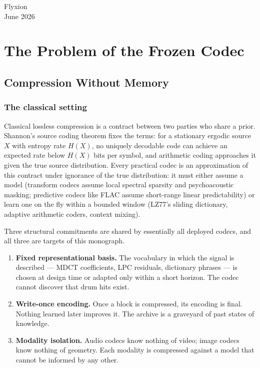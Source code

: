 \documentclass[11pt,oneside]{book}
\theoremstyle{remark}
\begin{document}
\medskip
\noindent Flyxion\\
June 2026

\tableofcontents

\mainmatter

\part{The Problem of the Frozen Codec}

\chapter{Compression Without Memory}

\section{The classical setting}

Classical lossless compression is a contract between two parties who
share a prior. Shannon's source coding theorem fixes the terms: for a
stationary ergodic source $X$ with entropy rate $H(X)$, no uniquely
decodable code can achieve an expected rate below $H(X)$ bits per
symbol, and arithmetic coding approaches it given the true source
distribution. Every practical codec is an approximation of this
contract under ignorance of the true distribution: it must either assume
a model (transform codecs assume local spectral sparsity and
psychoacoustic masking; predictive codecs like FLAC assume short-range
linear predictability) or learn one on the fly within a bounded window
(LZ77's sliding dictionary, adaptive arithmetic coders, context mixing).

Three structural commitments are shared by essentially all deployed
codecs, and all three are targets of this monograph.

\begin{enumerate}[leftmargin=2em]
\item \textbf{Fixed representational basis.} The vocabulary in which the
signal is described --- MDCT coefficients, LPC residuals, dictionary
phrases --- is chosen at design time or adapted only within a short
horizon. The codec cannot discover that drum hits exist.
\item \textbf{Write-once encoding.} Once a block is compressed, its
encoding is final. Nothing learned later improves it. The archive is a
graveyard of past states of knowledge.
\item \textbf{Modality isolation.} Audio codecs know nothing of video;
image codecs know nothing of geometry. Each modality is compressed
against a model that cannot be informed by any other.
\end{enumerate}
\end{document}
